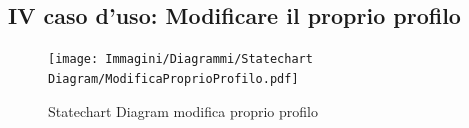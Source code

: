         \clearpage

        \subsection{IV caso d'uso: Modificare il proprio profilo}
            \begin{figure}[htbp!]
            \centering
                \texttt{[image: Immagini/Diagrammi/Statechart Diagram/ModificaProprioProfilo.pdf]}
            \caption{Statechart Diagram modifica proprio profilo}
            \end{figure}
